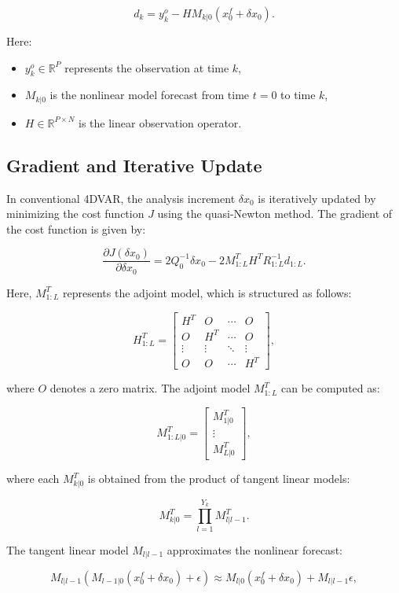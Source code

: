 \documentclass{article}
\begin{document}
\[
d_k = y^o_k - H M_{k|0} \left( x^f_0 + \delta x_0 \right).
\]

Here:
\begin{itemize}
    \item \( y^o_k \in \mathbb{R}^P \) represents the observation at time \( k \),
    \item \( M_{k|0} \) is the nonlinear model forecast from time \( t = 0 \) to time \( k \),
    \item \( H \in \mathbb{R}^{P \times N} \) is the linear observation operator.
\end{itemize}

\subsection{Gradient and Iterative Update}

In conventional 4DVAR, the analysis increment \( \delta x_0 \) is iteratively updated by minimizing the cost function \( J \) using the quasi-Newton method. The gradient of the cost function is given by:

\[
\frac{\partial J (\delta x_0)}{\partial \delta x_0} = 2 Q_0^{-1} \delta x_0 - 2 M^T_{1:L} H^T R_{1:L}^{-1} d_{1:L}.
\]

Here, \( M^T_{1:L} \) represents the adjoint model, which is structured as follows:

\[
H^T_{1:L} = \begin{bmatrix}
H^T & O & \cdots & O \\
O & H^T & \cdots & O \\
\vdots & \vdots & \ddots & \vdots \\
O & O & \cdots & H^T
\end{bmatrix},
\]

where \( O \) denotes a zero matrix. The adjoint model \( M^T_{1:L} \) can be computed as:

\[
M^T_{1:L|0} = \begin{bmatrix}
M^T_{1|0} \\
\vdots \\
M^T_{L|0}
\end{bmatrix},
\]

where each \( M^T_{k|0} \) is obtained from the product of tangent linear models:

\[
M^T_{k|0} = \prod_{l=1}^{Y_k} M^T_{l|l-1}.
\]

The tangent linear model \( M_{l|l-1} \) approximates the nonlinear forecast:

\[
M_{l|l-1} \left( M_{l-1|0} \left( x^f_0 + \delta x_0 \right) + \epsilon \right) \approx M_{l|0} \left( x^f_0 + \delta x_0 \right) + M_{l|l-1} \epsilon,
\]
\end{document}
